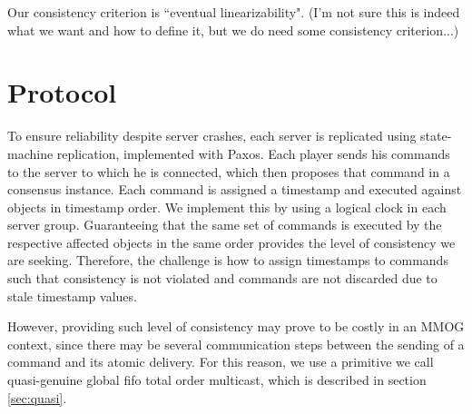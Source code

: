 \documentclass[times, 10pt]{article}
\begin{document}

Our consistency criterion is ``eventual linearizability". (I'm not sure this is indeed what we want and how to define it, but we do need some consistency criterion...)


% 
%
%



\section{Protocol}

To ensure reliability despite server crashes, each server is replicated using state-machine replication, implemented with Paxos. Each player sends his commands to the server to which he is connected, which then proposes that command in a consensus instance. Each command is assigned a timestamp and executed against objects in timestamp order. We implement this by using a logical clock in each server group. Guaranteeing that the same set of commands is executed by the respective affected objects in the same order provides the level of consistency we are seeking. Therefore, the challenge is how to assign timestamps to commands such that consistency is not violated and commands are not discarded due to stale timestamp values.

However, providing such level of consistency may prove to be costly in an MMOG context, since there may be several communication steps between the sending of a command and its atomic delivery. For this reason, we use a primitive we call quasi-genuine global fifo total order multicast, which is described in section \ref{sec:quasi}.
\end{document}
